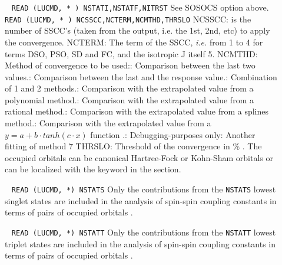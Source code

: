 \begin{description}
\item []\verb| |\newline
 \verb|READ (LUCMD, * ) NSTATI,NSTATF,NITRST|\newline
See SOSOCS option above.\newline
 \verb|READ (LUCMD, * ) NCSSCC,NCTERM,NCMTHD,THRSLO|\newline
     NCSSCC: is the number of SSCC's (taken from the output, i.e.
             the 1st, 2nd, etc) to apply the convergence.\newline
     NCTERM: The term of the SSCC, {\it i.e.} from 1 to 4 for terms
             DSO, PSO, SD and FC, and the isotropic J itself 5.\newline
     NCMTHD: Method of convergence to be used:: Comparison between the last two values.: Comparison between the last and the response value.: Combination of 1 and 2 methods.: Comparison with the extrapolated value from a polynomial method.: Comparison with the extrapolated value from a rational method.: Comparison with the extrapolated value from a splines method.: Comparison with the extrapolated value from a $y = a + b\cdot tanh (c \cdot x)$
                 function \cite{zps-ICP143-244107-2015}.: Debugging-purposes only: Another fitting of method 7\newline
     THRSLO: Threshold of the convergence in \% .\newline
The occupied orbitals can be canonical Hartree-Fock or Kohn-Sham orbitals or can be localized
with the  keyword in the  section.


\item []\verb| |\newline
 \verb|READ (LUCMD, *) NSTATS|\newline
Only the contributions from the \verb|NSTATS| lowest singlet states are
included in the analysis of spin-spin coupling constants in terms of
pairs of occupied orbitals \cite{spas079,spas086}.

\item []\verb| |\newline
 \verb|READ (LUCMD, *) NSTATT|\newline
 Only the contributions from the \verb|NSTATT| lowest triplet states are
 included in the analysis of spin-spin coupling constants in terms of
pairs of occupied orbitals \cite{spas079,spas086}.
\end{description}

